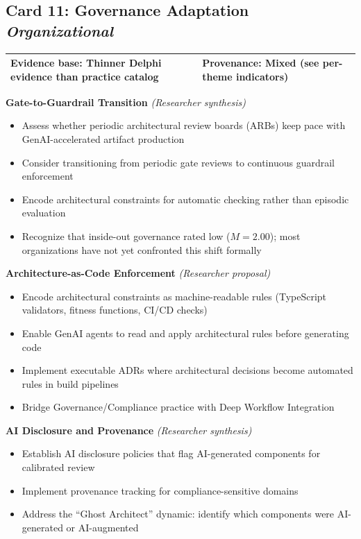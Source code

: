 \subsection*{Card 11: Governance Adaptation \hfill \textit{Organizational}}

\begin{tabular}{|p{7cm}|p{6cm}|}
    \hline
    \textbf{Evidence base:} Thinner Delphi evidence than practice catalog & \textbf{Provenance:} Mixed (see per-theme indicators) \\
    \hline
\end{tabular}

\vspace{0.5em}
\textbf{Gate-to-Guardrail Transition} \textit{(Researcher synthesis)}
\begin{itemize}[label=\checkbox]
    \item Assess whether periodic architectural review boards (ARBs) keep pace with GenAI-accelerated artifact production
    \item Consider transitioning from periodic gate reviews to continuous guardrail enforcement
    \item Encode architectural constraints for automatic checking rather than episodic evaluation
    \item Recognize that inside-out governance rated low ($M = 2.00$); most organizations have not yet confronted this shift formally
\end{itemize}

\vspace{0.5em}
\textbf{Architecture-as-Code Enforcement} \textit{(Researcher proposal)}
\begin{itemize}[label=\checkbox]
    \item Encode architectural constraints as machine-readable rules (TypeScript validators, fitness functions, CI/CD checks)
    \item Enable GenAI agents to read and apply architectural rules before generating code
    \item Implement executable ADRs where architectural decisions become automated rules in build pipelines
    \item Bridge Governance/Compliance practice with Deep Workflow Integration
\end{itemize}

\vspace{0.5em}
\textbf{AI Disclosure and Provenance} \textit{(Researcher synthesis)}
\begin{itemize}[label=\checkbox]
    \item Establish AI disclosure policies that flag AI-generated components for calibrated review
    \item Implement provenance tracking for compliance-sensitive domains
    \item Address the ``Ghost Architect'' dynamic: identify which components were AI-generated or AI-augmented
\end{itemize}

